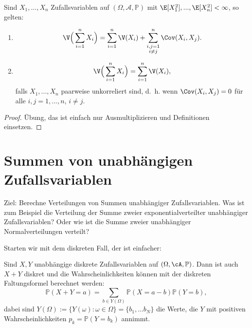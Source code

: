 \marginpar{\textcolor{red}{Vorlesung 22}}

\begin{satz}[Bienaymé]\label{bien}
 Sind $X_1,...,X_n$ Zufallsvariablen auf $(\Omega, \mathcal A, \mathbb P)$ mit $\E[X_1^2],...,\E[X_n^2] < \infty$, so gelten:
	\begin{enumerate}[label=(\roman*)]
		\item
		\[ \V\Big(\sum\limits_{i=1}^{n} X_i\Big) = \sum\limits_{i=1}^{n} \V(X_i) + \sum\limits_{\substack{i,j=1\\i \neq j}}^{n} \Cov(X_i,X_j).  \]
		\item \[ \V\Big(\sum\limits_{i=1}^{n} X_i\Big) = \sum\limits_{i=1}^{n} \V(X_i), \] falls $X_1,...,X_n$ paarweise unkorreliert sind, \mbox{d. h.} wenn $\Cov(X_i,X_j) = 0$ f\"ur alle $ i,j = 1,...,n$, $i\neq j$. 
	\end{enumerate}
\end{satz}

\begin{proof}
	Übung, das ist einfach nur Ausmultiplizieren und Definitionen einsetzen.
\end{proof}

\section{Summen von unabhängigen Zufallsvariablen}
Ziel: Berechne Verteilungen von Summen unabhängiger Zufallsvariablen. Was ist zum Beispiel die Verteilung der Summe zweier exponentialverteilter unabh\"angiger Zufallsvariablen? Oder wie ist die Summe zweier unabh\"angiger Normalverteilungen verteilt?\smallskip

Starten wir mit dem diskreten Fall, der ist einfacher:
\begin{satz}\label{diskreteFaltung}
	Sind $X,Y$ unabhängige diskrete Zufallsvariablen auf $(\Omega, \cA, \mathbb{P})$. Dann ist auch $X+Y$ diskret und die Wahrscheinlichkeiten k\"onnen mit der diskreten Faltungsformel berechnet werden:
	\[ \mathbb{P}(X+Y = a) = \sum\limits_{b \in Y(\Omega)} \mathbb{P}(X = a-b) \mathbb{P}(Y=b),
	\]
	dabei sind $Y(\Omega) := \{ Y(\omega): \omega \in \Omega\}=\{b_1,...b_N\}$ die Werte, die $Y$ mit positiven Wahrscheinlichkeiten $p_k=\mathbb P(Y=b_k)$ annimmt.
\end{satz}

